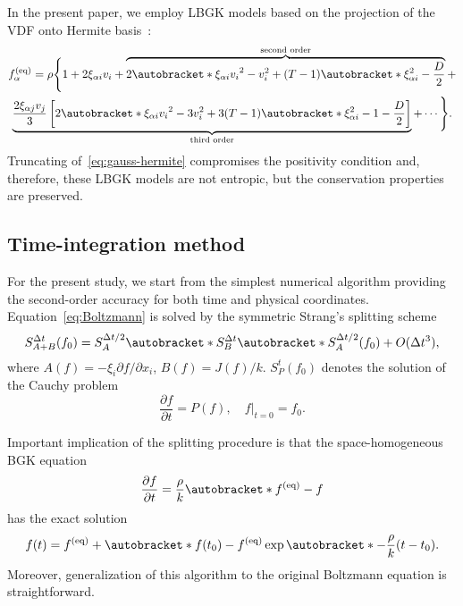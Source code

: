 \documentclass[]{elsarticle} %
\newcommand{\pder}[2][]{\frac{\partial#1}{\partial#2}}
\newcommand{\Pder}[2][]{\partial#1/\partial#2}
\newcommand{\OO}[1]{O(#1)}
\DeclarePairedDelimiter\autobracket()       %
\newcommand{\br}[1]{\autobracket*{#1}}
\newcommand{\xiai}{\xi_{\alpha i}}
\newcommand{\xiaj}{\xi_{\alpha j}}
\newcommand{\equil}[1]{#1^\mathrm{(eq)}}
\begin{document}
{%
In the present paper, we employ LBGK models based on the projection of the VDF onto Hermite basis~\cite{Shan2006}:
\begin{multline}\label{eq:gauss-hermite}
    \equil{f}_\alpha = \rho\Bigg\{ 1 + 2\xiai v_i + \overbrace{
        2\br{\xiai v_i}^2 - v_i^2 + (T-1)\br{\xiai^2 - \frac{D}2}
    }^\text{second order} + \\ \underbrace{
        \frac{2\xiaj v_j}3\left[ 2\br{\xiai v_i}^2 - 3v_i^2 + 3(T-1)\br{\xiai^2 - 1 - \frac{D}2}\right]
    }_\text{third order} + \cdots \Bigg\}.
\end{multline}
Truncating of~\eqref{eq:gauss-hermite} compromises the positivity condition and,
therefore, these LBGK models are not entropic, but the conservation properties are preserved.

\subsection{Time-integration method}\label{sec:splitting}

For the present study, we start from the simplest numerical algorithm providing the second-order accuracy
for both time and physical coordinates.
Equation~\eqref{eq:Boltzmann} is solved by the symmetric Strang's splitting scheme~\cite{Bobylev2001}
\begin{equation}\label{eq:Strang}
    S^{\Delta{t}}_{A+B}(f_0) = S^{\Delta{t}/2}_A \br{S^{\Delta{t}}_B \br{S^{\Delta{t}/2}_A(f_0)} } + \OO{\Delta{t}^3},
\end{equation}
where \(A(f) = -\xi_i\Pder[f]{x_i}\), \(B(f) = J(f)/k\).
\(S^t_P (f_0)\) denotes the solution of the Cauchy problem
\begin{equation}\label{eq:Cauchy}
    \pder[f]{t} = P(f), \quad f|_{t=0} = f_0.
\end{equation}

Important implication of the splitting procedure is that the space-homogeneous BGK equation
\begin{equation}\label{eq:bgk_homogeneous}
    \pder[f]{t} = \frac{\rho}k \br{\equil{f}-f}
\end{equation}
has the exact solution
\begin{equation}\label{eq:bgk_exact}
    f(t) = \equil{f} + \br{f(t_0)-\equil{f}}\exp\br{-\frac{\rho}k (t-t_0)}.
\end{equation}
Moreover, generalization of this algorithm to the original Boltzmann equation is straightforward.

}
\end{document}
